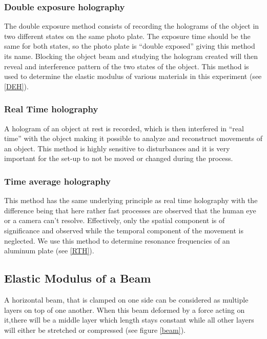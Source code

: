 \subsubsection{Double exposure holography}

The double exposure method consists of recording the holograms of the object in two different states on the same photo plate. The exposure time should be the same for both states, so the photo plate is ``double exposed'' giving this method its name. Blocking the object beam and studying the hologram created will then reveal and interference pattern of the two states of the object. This method is used to determine the elastic modulus of various materials in this experiment (see \ref{DEH}).

\subsubsection{Real Time holography}

A hologram of an object at rest is recorded, which is then interfered in ``real time'' with the object making it possible to analyze  and reconstruct movements of an object. This method is highly sensitive to disturbances and it is very important for the set-up to not be moved or changed during the process. 

\subsubsection{Time average holography}

This method has the same underlying principle as real time holography with the difference being that here rather fast processes are observed that the human eye or a camera can't resolve. Effectively, only the spatial component is of significance and observed while the temporal component of the movement is neglected. We use this method to determine resonance frequencies of an aluminum plate (see \ref{RTH}).



\subsection{Elastic Modulus of a Beam}

A horizontal beam, that is clamped on one side can be considered as multiple layers on top of one another. When this beam deformed by a force acting on it,there will be a middle layer which length stays constant while all other layers will either be stretched or compressed (see figure \ref{beam}).

